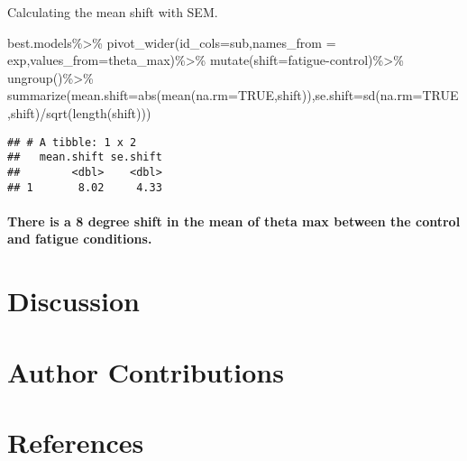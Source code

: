 \documentclass[
]{article}
\newenvironment{Shaded}{\begin{snugshade}}{\end{snugshade}}
\newcommand{\AttributeTok}[1]{\textcolor[rgb]{0.77,0.63,0.00}{#1}}
\newcommand{\ConstantTok}[1]{\textcolor[rgb]{0.00,0.00,0.00}{#1}}
\newcommand{\FunctionTok}[1]{\textcolor[rgb]{0.00,0.00,0.00}{#1}}
\newcommand{\NormalTok}[1]{#1}
\newcommand{\SpecialCharTok}[1]{\textcolor[rgb]{0.00,0.00,0.00}{#1}}
\begin{document}
Calculating the mean shift with SEM.

\begin{Shaded}
\begin{Highlighting}[]
\NormalTok{best.models}\SpecialCharTok{\%\textgreater{}\%}
  \FunctionTok{pivot\_wider}\NormalTok{(}\AttributeTok{id\_cols=}\NormalTok{sub,}\AttributeTok{names\_from =}\NormalTok{ exp,}\AttributeTok{values\_from=}\NormalTok{theta\_max)}\SpecialCharTok{\%\textgreater{}\%}
  \FunctionTok{mutate}\NormalTok{(}\AttributeTok{shift=}\NormalTok{fatigue}\SpecialCharTok{{-}}\NormalTok{control)}\SpecialCharTok{\%\textgreater{}\%}
  \FunctionTok{ungroup}\NormalTok{()}\SpecialCharTok{\%\textgreater{}\%}
  \FunctionTok{summarize}\NormalTok{(}\AttributeTok{mean.shift=}\FunctionTok{abs}\NormalTok{(}\FunctionTok{mean}\NormalTok{(}\AttributeTok{na.rm=}\ConstantTok{TRUE}\NormalTok{,shift)),}\AttributeTok{se.shift=}\FunctionTok{sd}\NormalTok{(}\AttributeTok{na.rm=}\ConstantTok{TRUE}\NormalTok{,shift)}\SpecialCharTok{/}\FunctionTok{sqrt}\NormalTok{(}\FunctionTok{length}\NormalTok{(shift)))}
\end{Highlighting}
\end{Shaded}

\begin{verbatim}
## # A tibble: 1 x 2
##   mean.shift se.shift
##        <dbl>    <dbl>
## 1       8.02     4.33
\end{verbatim}

\hypertarget{there-is-a-8-degree-shift-in-the-mean-of-theta-max-between-the-control-and-fatigue-conditions.}{%
\paragraph{There is a 8 degree shift in the mean of theta max between
the control and fatigue
conditions.}\label{there-is-a-8-degree-shift-in-the-mean-of-theta-max-between-the-control-and-fatigue-conditions.}}

\hypertarget{discussion}{%
\section{Discussion}\label{discussion}}

\hypertarget{author-contributions}{%
\section{Author Contributions}\label{author-contributions}}

\hypertarget{references}{%
\section*{References}\label{references}}
\end{document}
